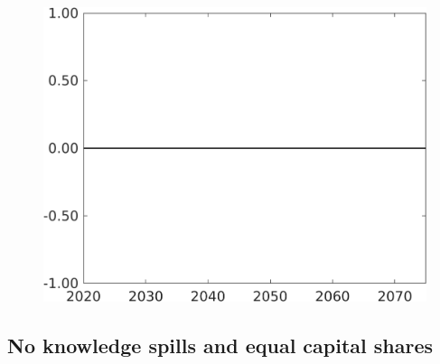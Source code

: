 \documentclass[12pt]{article}
\begin{document}
\begin{figure}[h!!]
\begin{minipage}[]{0.32\textwidth}
	\end{minipage}	
	\begin{minipage}[]{0.32\textwidth}
		\includegraphics[width=1\textwidth]{../../codding_model/own_basedOnFried/optimalPol_010922_revision/figures/all_13Sept22/CompTaufPER_bytaul_Reg0_F_spillover0_nsk0_xgr1_knspil0_sep0_LFlimit1_emsbase0_countec0_GovRev0_etaa0.79_lgd0.png}
	\end{minipage}	
\end{figure}

\clearpage \newpage
\subsection{No knowledge spills and equal capital shares}
\end{document}
